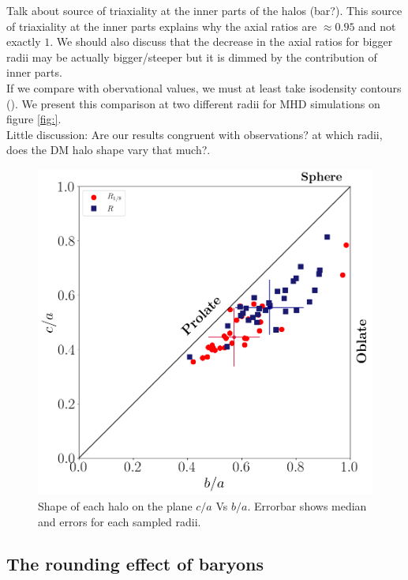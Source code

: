 \documentclass[a4paper,fleqn,usenatbib]{mnras}
\begin{document}
Talk about source of triaxiality at the inner parts of the halos (bar?). This source of triaxiality at the inner parts explains why the axial ratios are $\approx 0.95$ and not exactly $1$. We should also discuss that the decrease in the axial ratios for bigger radii may be actually bigger/steeper but it is dimmed by the contribution of inner parts.\\

If we compare with obervational values, we must at least take isodensity contours (). We present this comparison  at two different radii for MHD simulations on figure \ref{fig:}. \\

Little discussion: Are our results congruent with observations? at which radii, does the DM halo shape vary that much?.\\

\begin{figure}
  \centering
 \includegraphics[width=0.9\columnwidth]{./pics/Triaxial_Plane/Triax_DM.png}
  
  \hfill
  \caption{Shape of each halo on the plane $c/a$ Vs $b/a$. Errorbar shows median and errors for each sampled radii. }
  \label{fig:Triax_DM}
\end{figure}

\subsection{The rounding effect of baryons}
\end{document}
